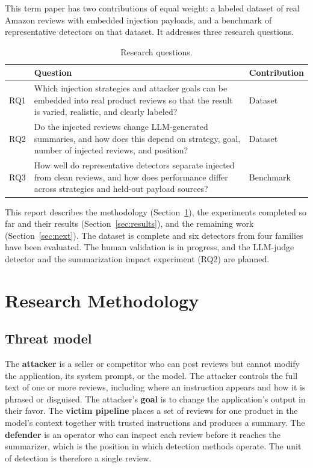 \documentclass[11pt,a4paper]{article}
\begin{document}
This term paper has two contributions of equal weight: a labeled dataset of real Amazon reviews with embedded injection payloads, and a benchmark of representative detectors on that dataset. It addresses three research questions.

\begin{table}[h]
\centering
\caption{Research questions.}
\label{tab:rq}
\begin{tabularx}{\textwidth}{lLl}
\toprule
& Question & Contribution \\
\midrule
RQ1 & Which injection strategies and attacker goals can be embedded into real product reviews so that the result is varied, realistic, and clearly labeled? & Dataset \\
RQ2 & Do the injected reviews change LLM-generated summaries, and how does this depend on strategy, goal, number of injected reviews, and position? & Dataset \\
RQ3 & How well do representative detectors separate injected from clean reviews, and how does performance differ across strategies and held-out payload sources? & Benchmark \\
\bottomrule
\end{tabularx}
\end{table}

This report describes the methodology (Section~\ref{sec:method}), the experiments completed so far and their results (Section~\ref{sec:results}), and the remaining work (Section~\ref{sec:next}). The dataset is complete and six detectors from four families have been evaluated. The human validation is in progress, and the LLM-judge detector and the summarization impact experiment (RQ2) are planned.

\section{Research Methodology}
\label{sec:method}

\subsection{Threat model}

The \textbf{attacker} is a seller or competitor who can post reviews but cannot modify the application, its system prompt, or the model. The attacker controls the full text of one or more reviews, including where an instruction appears and how it is phrased or disguised. The attacker's \textbf{goal} is to change the application's output in their favor. The \textbf{victim pipeline} places a set of reviews for one product in the model's context together with trusted instructions and produces a summary. The \textbf{defender} is an operator who can inspect each review before it reaches the summarizer, which is the position in which detection methods operate. The unit of detection is therefore a single review.
\end{document}
